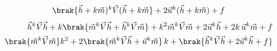 
\begin{align}
\brak{\vec{h}+k\vec{m})^k \vec{V}(\vec{h}+k\vec{m}}+2\vec{u}^k(\vec{h}+k\vec{m})+f
\end{align}
\begin{align}
\vec{h}^k \vec{V} \vec{h}+ k\brak{\vec{m}^k \vec{V} \vec{h} + \vec{h}^k \vec{V} \vec{m}}+ k^2 \vec{m}^k \vec{V} \vec{m}+ 2\vec{u}^k\vec{h} + 2k\,\vec{u}^k\vec{m} + f \\
\brak{\vec{m}^k \vec{V} \vec{m}}k^2+2\brak{\vec{m}^k \vec{V}\vec{h} + \vec{u}^k\vec{m}}\,k
   + \brak{\vec{h}^k \vec{V} \vec{h} + 2\vec{u}^k\vec{h} + f}
\end{align}
